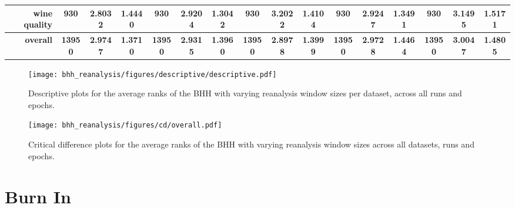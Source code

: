 \begin{table}[htbp]
{\begin{tabular}{rccccccccccccccc}
			wine quality                        & 930                                     & \cellcolor[rgb]{ .776,  .937,  .808}\textcolor[rgb]{ 0,  .38,  0}{2.8032} & 1.4440          & 930                            & 2.9204                                                                    & 1.3042          & 930                             & 3.2022                                                                             & 1.4104          & 930                             & 2.9247                                                                    & 1.3491          & 930                             & 3.1495                                                                    & 1.5171          \\
			\midrule
			\textbf{overall}                    & \textbf{13950}                          & \textbf{2.9747}                                                           & \textbf{1.3710} & \textbf{13950}                 & \textbf{2.9315}                                                           & \textbf{1.3960} & \textbf{13950}                  & \cellcolor[rgb]{ .776,  .937,  .808}\textcolor[rgb]{ 0,  .38,  0}{\textbf{2.8978}} & \textbf{1.3999} & \textbf{13950}                  & \textbf{2.9728}                                                           & \textbf{1.4464} & \textbf{13950}                  & \textbf{3.0047}                                                           & \textbf{1.4805} \\
		\end{tabular}%
	}

\end{table}%

\begin{figure}[htbp]
	\centering
	\texttt{[image: bhh\_reanalysis/figures/descriptive/descriptive.pdf]}
	\caption{Descriptive plots for the average ranks of the \acs{BHH} with varying reanalysis window sizes per dataset, across all runs and epochs.}
	\label{fig:results:reanalysis:descriptive:descriptive}
\end{figure}


\begin{figure}[htbp]
	\centering
	\texttt{[image: bhh\_reanalysis/figures/cd/overall.pdf]}
	\caption{Critical difference plots for the average ranks of the \acs{BHH} with varying reanalysis window sizes across all datasets, runs and epochs.}
	\label{fig:results:reanalysis:descriptive:cd}
\end{figure}


\section{Burn In}\label{sec:results:bhh_variant_burn_in}

